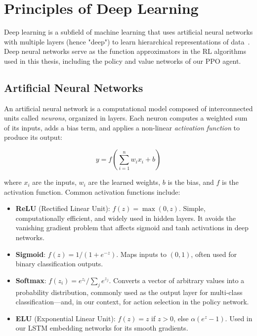 \section{Principles of Deep Learning}

Deep learning is a subfield of machine learning that uses artificial neural networks with multiple layers (hence "deep") to learn hierarchical representations of data~\cite{lecun2015deep}. Deep neural networks serve as the function approximators in the RL algorithms used in this thesis, including the policy and value networks of our PPO agent.

\subsection{Artificial Neural Networks}

An artificial neural network is a computational model composed of interconnected units called \textit{neurons}, organized in layers. Each neuron computes a weighted sum of its inputs, adds a bias term, and applies a non-linear \textit{activation function} to produce its output:

\begin{equation}
    y = f\left(\sum_{i=1}^{n} w_i x_i + b\right)
\end{equation}

where $x_i$ are the inputs, $w_i$ are the learned weights, $b$ is the bias, and $f$ is the activation function. Common activation functions include:

\begin{itemize}
    \item \textbf{ReLU} (Rectified Linear Unit): $f(z) = \max(0, z)$. Simple, computationally efficient, and widely used in hidden layers. It avoids the vanishing gradient problem that affects sigmoid and tanh activations in deep networks.
    \item \textbf{Sigmoid}: $f(z) = 1 / (1 + e^{-z})$. Maps inputs to $(0, 1)$, often used for binary classification outputs.
    \item \textbf{Softmax}: $f(z_i) = e^{z_i} / \sum_j e^{z_j}$. Converts a vector of arbitrary values into a probability distribution, commonly used as the output layer for multi-class classification—and, in our context, for action selection in the policy network.
    \item \textbf{ELU} (Exponential Linear Unit): $f(z) = z$ if $z > 0$, else $\alpha(e^z - 1)$. Used in our LSTM embedding networks for its smooth gradients.
\end{itemize}

